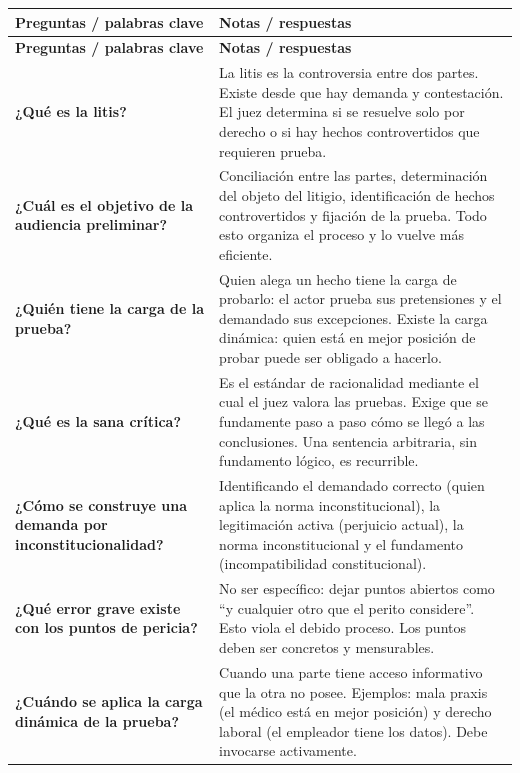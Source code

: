 \documentclass[12pt,oneside]{book}
\begin{document}
\begin{longtable}{
    >{\raggedright\arraybackslash}p{}
    >{\raggedright\arraybackslash}p{}
}
\toprule
\textbf{Preguntas / palabras clave} & \textbf{Notas / respuestas} \\
\midrule
\endfirsthead

\toprule
\textbf{Preguntas / palabras clave} & \textbf{Notas / respuestas} \\
\midrule
\endhead

\textbf{¿Qué es la litis?} &
La litis es la controversia entre dos partes. Existe desde que hay demanda y contestación. El juez determina si se resuelve solo por derecho o si hay hechos controvertidos que requieren prueba. \\

\textbf{¿Cuál es el objetivo de la audiencia preliminar?} &
Conciliación entre las partes, determinación del objeto del litigio, identificación de hechos controvertidos y fijación de la prueba. Todo esto organiza el proceso y lo vuelve más eficiente. \\

\textbf{¿Quién tiene la carga de la prueba?} &
Quien alega un hecho tiene la carga de probarlo: el actor prueba sus pretensiones y el demandado sus excepciones. Existe la carga dinámica: quien está en mejor posición de probar puede ser obligado a hacerlo. \\

\textbf{¿Qué es la sana crítica?} &
Es el estándar de racionalidad mediante el cual el juez valora las pruebas. Exige que se fundamente paso a paso cómo se llegó a las conclusiones. Una sentencia arbitraria, sin fundamento lógico, es recurrible. \\

\textbf{¿Cómo se construye una demanda por inconstitucionalidad?} &
Identificando el demandado correcto (quien aplica la norma inconstitucional), la legitimación activa (perjuicio actual), la norma inconstitucional y el fundamento (incompatibilidad constitucional). \\

\textbf{¿Qué error grave existe con los puntos de pericia?} &
No ser específico: dejar puntos abiertos como ``y cualquier otro que el perito considere''. Esto viola el debido proceso. Los puntos deben ser concretos y mensurables. \\

\textbf{¿Cuándo se aplica la carga dinámica de la prueba?} &
Cuando una parte tiene acceso informativo que la otra no posee. Ejemplos: mala praxis (el médico está en mejor posición) y derecho laboral (el empleador tiene los datos). Debe invocarse activamente. \\


\end{longtable}
\end{document}
